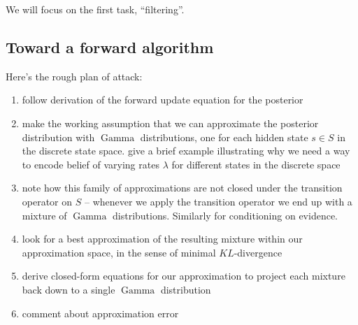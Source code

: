\documentclass[twoside, 11pt]{article}
\DeclareMathOperator*{\gammad}{Gamma}
\begin{document}
We will focus on the first task, ``filtering''.

\subsection{Toward a forward algorithm}

Here's the rough plan of attack:
\begin{enumerate}
\item follow \citet*{russell2002artificial} derivation of the forward update equation for the posterior
\item make the working assumption that we can approximate the posterior distribution with $\gammad$ distributions, one for each hidden state $s \in S$ in the discrete state space. give a brief example illustrating why we need a way to encode belief of varying rates $\lambda$ for different states in the discrete space
\item note how this family of approximations are not closed under the transition operator on $S$ -- whenever we apply the transition operator we end up with a mixture of $\gammad$ distributions. Similarly for conditioning on evidence.
\item look for a best approximation of the resulting mixture within our approximation space, in the sense of minimal $KL$-divergence
\item derive closed-form equations for our approximation to project each mixture back down to a single $\gammad$ distribution
\item comment about approximation error
\end{enumerate}
\end{document}
